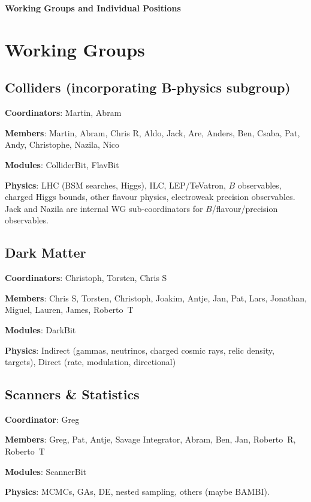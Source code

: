 

\centerline{\textbf{Working Groups and Individual Positions}}\bigskip 


\section{Working Groups}

\subsection{Colliders (incorporating B-physics subgroup)}

\textbf{Coordinators}: Martin, Abram

\textbf{Members}: Martin, Abram, Chris R, Aldo, Jack, Are, Anders, Ben, Csaba, Pat, Andy, Christophe, Nazila, Nico 

\textbf{Modules}: ColliderBit, FlavBit

\textbf{Physics}: LHC (BSM searches, Higgs), ILC, LEP/TeVatron, $B$ observables, charged Higgs bounds, other flavour physics, electroweak precision observables.  Jack and Nazila are internal WG sub-coordinators for $B$/flavour/precision observables.


\subsection{Dark Matter}

\textbf{Coordinators}: Christoph, Torsten, Chris S

\textbf{Members}: Chris S, Torsten, Christoph, Joakim, Antje, Jan, Pat, Lars, Jonathan, Miguel, Lauren, James, Roberto~T

\textbf{Modules}: DarkBit

\textbf{Physics}: Indirect (gammas, neutrinos, charged cosmic rays, relic density, targets), Direct (rate, modulation, directional)


\subsection{Scanners \& Statistics}

\textbf{Coordinator}: Greg

\textbf{Members}: Greg, Pat, Antje, Savage Integrator, Abram, Ben, Jan, Roberto~R, Roberto~T

\textbf{Modules}: ScannerBit

\textbf{Physics}: MCMCs, GAs, DE, nested sampling, others (maybe BAMBI).


